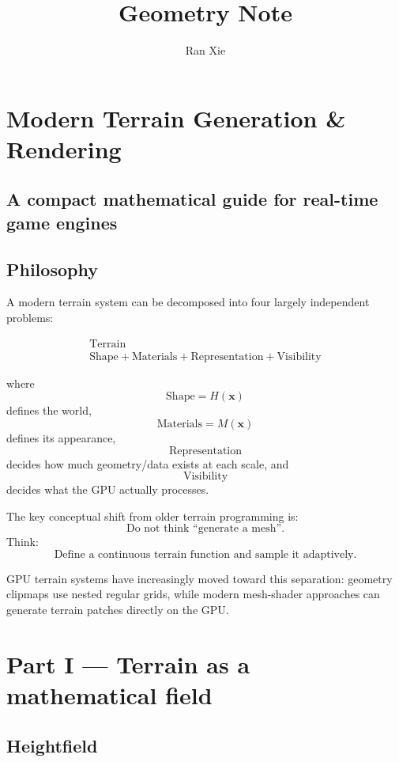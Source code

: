 \documentclass[12pt]{article}
\title{Geometry Note}
\author{Ran Xie}
\begin{document}
	\maketitle
	
	\section*{Modern Terrain Generation \& Rendering}
	\subsection*{A compact mathematical guide for real-time game engines}
	
	\subsection*{Philosophy}
	
	A modern terrain system can be decomposed into four largely independent problems:
	
	\[
	\boxed{
		\begin{array}{c}
			\text{Terrain} \\
			\hline
			\text{Shape} + \text{Materials} + \text{Representation} + \text{Visibility}
		\end{array}
	}
	\]
	
	where
	\[
	\text{Shape}=H(\mathbf x)
	\]
	defines the world,
	\[
	\text{Materials}=M(\mathbf x)
	\]
	defines its appearance,
	\[
	\text{Representation}
	\]
	decides how much geometry/data exists at each scale, and
	\[
	\text{Visibility}
	\]
	decides what the GPU actually processes.
	
	The key conceptual shift from older terrain programming is:
	\[
	\boxed{\text{Do not think ``generate a mesh''.}}
	\]
	Think:
	\[
	\boxed{\text{Define a continuous terrain function and sample it adaptively.}}
	\]
	
	GPU terrain systems have increasingly moved toward this separation: geometry clipmaps use nested regular grids, while modern mesh-shader approaches can generate terrain patches directly on the GPU.
	
	\section*{Part I — Terrain as a mathematical field}
	
	\subsection{Heightfield}
	
\end{document}
